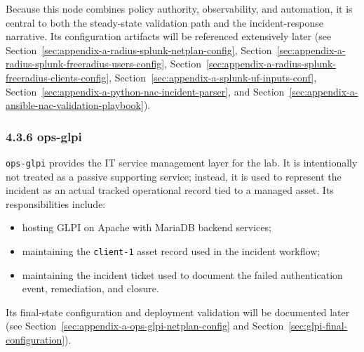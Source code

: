 \documentclass[11pt]{article}
\begin{document}
Because this node combines policy authority, observability, and automation, it is central to both the steady-state validation path and the incident-response narrative. Its configuration artifacts will be referenced extensively later (see Section~\ref{sec:appendix-a-radius-splunk-netplan-config}, Section~\ref{sec:appendix-a-radius-splunk-freeradius-users-config}, Section~\ref{sec:appendix-a-radius-splunk-freeradius-clients-config}, Section~\ref{sec:appendix-a-splunk-uf-inputs-conf}, Section~\ref{sec:appendix-a-python-nac-incident-parser}, and Section~\ref{sec:appendix-a-ansible-nac-validation-playbook}).

\subsubsection{4.3.6 ops-glpi}
\label{sec:ops-glpi-role}

\texttt{ops-glpi} provides the IT service management layer for the lab. It is intentionally not treated as a passive supporting service; instead, it is used to represent the incident as an actual tracked operational record tied to a managed asset. Its responsibilities include:

\begin{itemize}
    \item hosting GLPI on Apache with MariaDB backend services;
    \item maintaining the \texttt{client-1} asset record used in the incident workflow;
    \item maintaining the incident ticket used to document the failed authentication event, remediation, and closure.
\end{itemize}

Its final-state configuration and deployment validation will be documented later (see Section~\ref{sec:appendix-a-ops-glpi-netplan-config} and Section~\ref{sec:glpi-final-configuration}).

\end{document}
